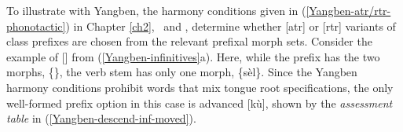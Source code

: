 \noindent
To illustrate with Yangben, the harmony conditions given in (\ref{Yangben-atr/rtr-phonotactic}) in Chapter \ref{ch2}, \latr\ and \ratr, determine whether [atr] or [rtr] variants of class prefixes are chosen from the relevant prefixal morph sets. Consider the example of [] from (\ref{Yangben-infinitives}a). Here, while the prefix has the two morphs, \{\}, the verb stem has only one morph, \{sèl\}. Since the Yangben harmony conditions  prohibit words that mix tongue root specifications, the only well-formed prefix option  in this case is advanced [kù], shown by the \textit{assessment table} in (\ref{Yangben-descend-inf-moved}).

